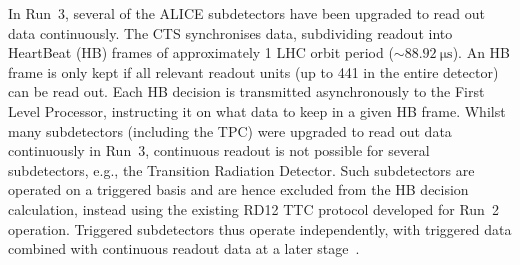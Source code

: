 In Run~3, several of the ALICE subdetectors have been upgraded to read out data continuously. The CTS synchronises data, subdividing readout into HeartBeat (HB) frames of approximately 1 LHC orbit period ($\sim\SI{88.92}{\micro\second}$). An HB frame is only kept if all relevant readout units (up to 441 in the entire detector) can be read out. Each HB decision is transmitted asynchronously to the First Level Processor, instructing it on what data to keep in a given HB frame. Whilst many subdetectors (including the TPC) were upgraded to read out data continuously in Run~3, continuous readout is not possible for several subdetectors, e.g.,  the Transition Radiation Detector. Such subdetectors are operated on a triggered basis and are hence excluded from the HB decision calculation, instead using the existing RD12 TTC protocol developed for Run~2 operation. Triggered subdetectors thus operate independently, with triggered data combined with continuous readout data at a later stage~\cite{alice-trigger-run3}.

